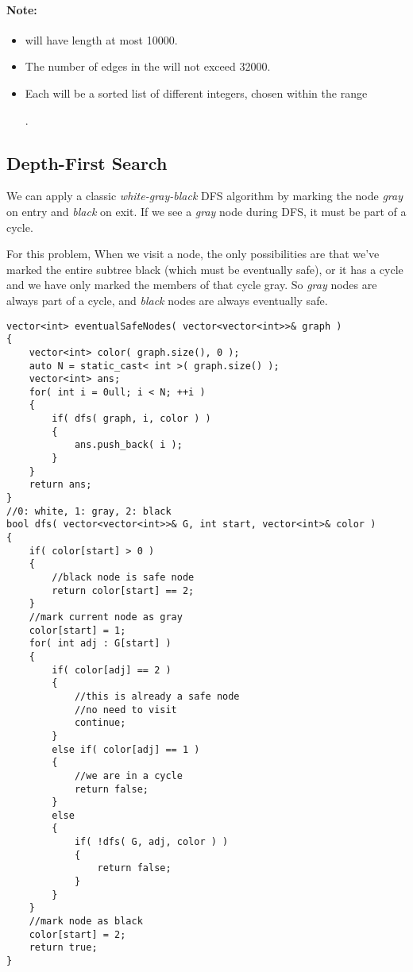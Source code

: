 \paragraph{Note:}

\begin{itemize}
\item {} will have length at most 10000.
\item The number of edges in the  will not exceed 32000.
\item Each  will be a sorted list of different integers, chosen within the range 

.
\end{itemize}

\subsection{Depth-First Search}
We can apply a classic \textit{white-gray-black} DFS algorithm by marking the node \textit{gray} on entry and \textit{black} on exit. If we see a \textit{gray} node during DFS, it must be part of a cycle.

For this problem, When we visit a node, the only possibilities are that we've marked the entire subtree black (which must be eventually safe), or it has a cycle and we have only marked the members of that cycle gray. So \textit{gray} nodes are always part of a cycle, and \textit{black} nodes are always eventually safe.

\setcounter{lstlisting}{0}
\begin{lstlisting}[style=customc, caption={DP}]
vector<int> eventualSafeNodes( vector<vector<int>>& graph )
{
    vector<int> color( graph.size(), 0 );
    auto N = static_cast< int >( graph.size() );
    vector<int> ans;
    for( int i = 0ull; i < N; ++i )
    {
        if( dfs( graph, i, color ) )
        {
            ans.push_back( i );
        }
    }
    return ans;
}
//0: white, 1: gray, 2: black
bool dfs( vector<vector<int>>& G, int start, vector<int>& color )
{
    if( color[start] > 0 )
    {
        //black node is safe node
        return color[start] == 2;
    }
    //mark current node as gray
    color[start] = 1;
    for( int adj : G[start] )
    {
        if( color[adj] == 2 )
        {
            //this is already a safe node
            //no need to visit
            continue;
        }
        else if( color[adj] == 1 )
        {
            //we are in a cycle
            return false;
        }
        else
        {
            if( !dfs( G, adj, color ) )
            {
                return false;
            }
        }
    }
    //mark node as black
    color[start] = 2;
    return true;
}
\end{lstlisting}